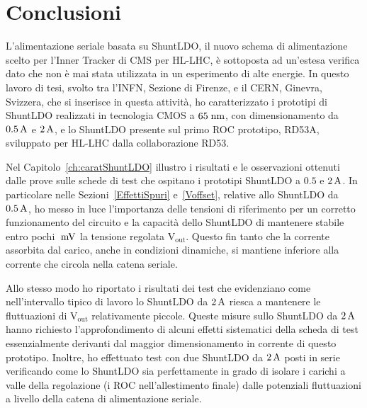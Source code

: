 \chapter{Conclusioni}

L'alimentazione seriale basata su ShuntLDO, il nuovo schema di alimentazione scelto per l'Inner Tracker di CMS per HL-LHC, \`e sottoposta ad un'estesa verifica dato che non \`e mai stata utilizzata in un esperimento di alte energie. In questo lavoro di tesi, svolto tra l'INFN, Sezione di Firenze, e il CERN, Ginevra, Svizzera, che si inserisce in questa attivit\`a, ho  caratterizzato i prototipi di ShuntLDO realizzati in tecnologia CMOS a $65\rm \; nm$, con dimensionamento da $0.5\rm \, A$ e $2\rm \, A$, e lo ShuntLDO presente sul primo ROC prototipo, RD53A, sviluppato per HL-LHC dalla collaborazione RD53.




Nel Capitolo~\ref{ch:caratShuntLDO} illustro i risultati e le osservazioni ottenuti dalle prove sulle schede di test che ospitano i prototipi ShuntLDO a $0.5$ e $2\rm \, A$. 
In particolare nelle Sezioni~\ref{EffettiSpuri} e~\ref{Voffset}, relative allo ShuntLDO da $0.5\rm \, A$, ho messo in luce l'importanza delle tensioni di riferimento per un corretto funzionamento del circuito e la capacità dello ShuntLDO di mantenere stabile entro pochi $\rm \; mV$ la tensione regolata $\mathrm{V_{out}}$. 
Questo fin tanto che la corrente assorbita dal carico, anche in condizioni dinamiche, si mantiene inferiore alla corrente che circola nella catena seriale.

Allo stesso modo ho riportato i risultati dei test che evidenziano come nell'intervallo tipico di lavoro lo ShuntLDO da $2\rm \, A$ riesca a mantenere le fluttuazioni di $\mathrm{V_{out}}$ relativamente piccole. Queste misure sullo ShuntLDO da $2\rm \, A$ hanno richiesto l'approfondimento di alcuni effetti sistematici della scheda di test essenzialmente derivanti dal maggior dimensionamento in corrente di questo prototipo. 
Inoltre, ho effettuato test con due ShuntLDO da $2\rm \, A$ posti in serie verificando come lo ShuntLDO sia perfettamente in grado di isolare i carichi a valle della regolazione (i ROC nell'allestimento finale) dalle potenziali fluttuazioni a livello della catena di alimentazione seriale.

